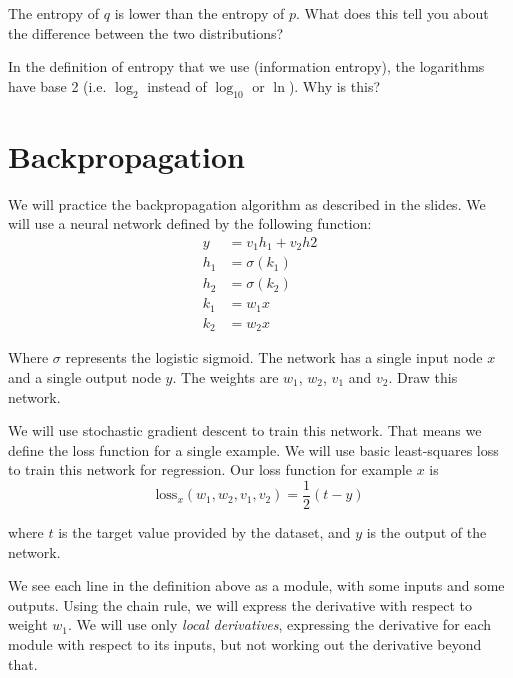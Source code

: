 \documentclass[11pt]{article}
\begin{document}
The entropy of $q$ is lower than the entropy of $p$. What does this tell you about the difference between the two distributions?



In the definition of entropy that we use (information entropy), the logarithms have base 2 (i.e. $\log_2$ instead of $\log_{10}$ or $\ln$). Why is this?



\section{Backpropagation}


We will practice the backpropagation algorithm as described in the slides. We will use a neural network defined by the following function:
\begin{align*}
y &= v_1h_1 + v_2h2 \\
h_1 &= \sigma(k_1) \\
h_2 &= \sigma(k_2) \\
k_1 &= w_1x \\
k_2 &= w_2x 
\end{align*}

Where $\sigma$ represents the logistic sigmoid. The network has a single input node $x$ and a single output node $y$. The weights are $w_1$, $w_2$, $v_1$ and $v_2$. Draw this network. 



We will use stochastic gradient descent to train this network. That means we define the loss function for a single example. We will use basic least-squares loss to train this network for regression. Our loss function for example $x$ is
\[
\text{loss}_x(w_1, w_2, v_1, v_2) = \frac{1}{2}\left(t - y\right)
\]

where $t$ is the target value provided by the dataset, and $y$ is the output of the network.

We see each line in the definition above as a module, with some inputs and some outputs. Using the chain rule, we will express the derivative with respect to weight $w_1$. We will use only \emph{local derivatives}, expressing the derivative for each module with respect to its inputs, but not working out the derivative beyond that.
\end{document}
